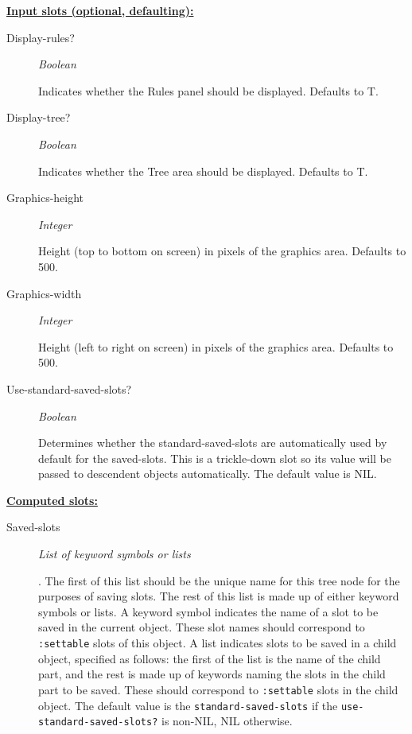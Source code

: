 \documentclass [11pt]{book}
\begin{document}
\begin{itemize}
\textbf{
\underline{Input slots (optional, defaulting):}}

\begin{description}

\item [Display-rules?]
\emph{Boolean}

 Indicates whether the Rules panel should be displayed. Defaults to T.




\item [Display-tree?]
\emph{Boolean}

 Indicates whether the Tree area should be displayed. Defaults to T.




\item [Graphics-height]
\emph{Integer}

 Height (top to bottom on screen) in pixels of the graphics area. Defaults to 500.




\item [Graphics-width]
\emph{Integer}

 Height (left to right on screen) in pixels of the graphics area. Defaults to 500.




\item [Use-standard-saved-slots?]
\emph{Boolean}

 Determines whether the standard-saved-slots are automatically used by default for the
saved-slots. This is a trickle-down slot so its value will be passed to descendent objects automatically.
The default value is NIL.




\end{description}






\textbf{
\underline{Computed slots:}}

\begin{description}

\item [Saved-slots]
\emph{List of keyword symbols or lists}

.
The first of this list should be the unique name for this tree node for the purposes of saving slots.
The rest of this list is made up of either keyword symbols or lists. A keyword symbol indicates the
name of a slot to be saved in the current object. These slot names should correspond to \texttt{:settable}
slots of this object. A list indicates slots to be saved in a child object, specified as
follows: the first of the list is the name of the child part, and the rest is made up of keywords naming
the slots in the child part to be saved. These should correspond to \texttt{:settable}
slots in the child object.
The default value is the \texttt{standard-saved-slots} if the \texttt{use-standard-saved-slots?} is non-NIL, NIL otherwise.





\end{description}
\end{itemize}
\end{document}
